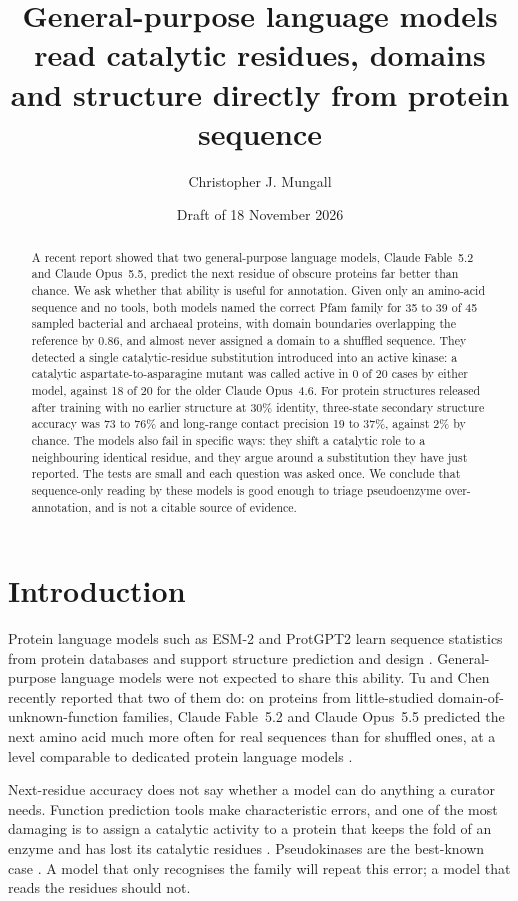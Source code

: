 \documentclass[11pt]{article}
\title{General-purpose language models read catalytic residues, domains and structure directly from protein sequence}
\author{Christopher J. Mungall \todo{confirm authors and affiliations}}
\date{Draft of 18 November 2026}
\begin{document}
\maketitle

\begin{abstract}
A recent report showed that two general-purpose language models, Claude Fable~5.2 and Claude Opus~5.5,
predict the next residue of obscure proteins far better than chance. We ask whether that ability is useful
for annotation. Given only an amino-acid sequence and no tools, both models named the correct Pfam family
for 35 to 39 of 45 sampled bacterial and archaeal proteins, with domain boundaries overlapping the
reference by 0.86, and almost never assigned a domain to a shuffled sequence. They detected a single
catalytic-residue substitution introduced into an active kinase: a catalytic aspartate-to-asparagine mutant
was called active in 0 of 20 cases by either model, against 18 of 20 for the older Claude Opus~4.6. For
protein structures released after training with no earlier structure at 30\% identity, three-state
secondary structure accuracy was 73 to 76\% and long-range contact precision 19 to 37\%, against 2\% by
chance. The models also fail in specific ways: they shift a catalytic role to a neighbouring identical
residue, and they argue around a substitution they have just reported. The tests are small and each
question was asked once. We conclude that sequence-only reading by these models is good enough to triage
pseudoenzyme over-annotation, and is not a citable source of evidence.
\end{abstract}

\section{Introduction}

Protein language models such as ESM-2 and ProtGPT2 learn sequence statistics from protein databases and
support structure prediction and design \citep{lin2023esm2,ferruz2022protgpt2}. General-purpose language
models were not expected to share this ability. Tu and Chen recently reported that two of them do: on
proteins from little-studied domain-of-unknown-function families, Claude Fable~5.2 and Claude Opus~5.5
predicted the next amino acid much more often for real sequences than for shuffled ones, at a level
comparable to dedicated protein language models \citep{tu2026claude,tu2026probe}.

Next-residue accuracy does not say whether a model can do anything a curator needs. Function prediction
tools make characteristic errors, and one of the most damaging is to assign a catalytic activity to a
protein that keeps the fold of an enzyme and has lost its catalytic residues
\citep{decrecy2025limitations}. Pseudokinases are the best-known case \citep{kwon2019pseudokinases}. A
model that only recognises the family will repeat this error; a model that reads the residues should not.
\end{document}
